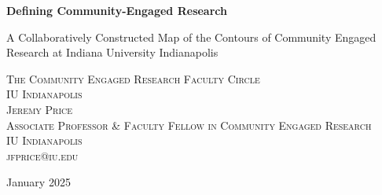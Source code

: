 \thispagestyle{empty}
\begin{center}
\vspace*{-1em}
{\LARGE\bfseries Defining Community-Engaged Research}
\vspace{0.5em}

{\large A Collaboratively Constructed Map of the Contours of Community Engaged Research at Indiana University Indianapolis}
\vspace{1em}

\large\mdseries\scshape
The Community Engaged Research Faculty Circle\\
IU Indianapolis\\
\vspace{0.5em}
Jeremy Price\\
Associate Professor \& Faculty Fellow in Community Engaged Research\\
IU Indianapolis\\
jfprice@iu.edu
\vspace{1em}

{\large\mdseries January 2025}
\end{center}
\vspace{1em}
\newpage
